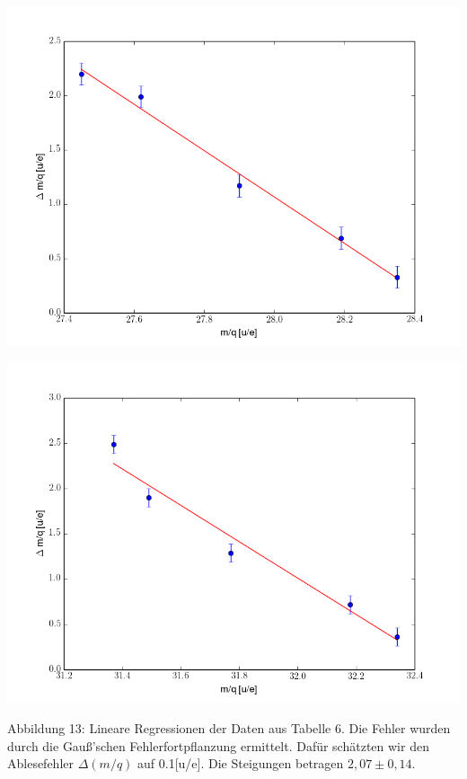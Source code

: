 \begin{center}
\begin{minipage}[t]{0.49\textwidth}
\includegraphics[width=\textwidth]{img/mq1}
\end{minipage}
\begin{minipage}[t]{0.49\textwidth}
\includegraphics[width=\textwidth]{img/mq2}
\end{minipage}
\end{center}

Abbildung 13: Lineare Regressionen der Daten aus Tabelle 6. Die Fehler wurden \hspace*{2,5cm} durch die Gauß’schen Fehlerfortpflanzung ermittelt. Dafür schätzten \hspace*{2,5cm} wir den Ablesefehler $\Delta(m/q)$ auf 0.1[u/e]. Die Steigungen betragen \hspace*{2,5cm} $2,07\pm 0,14$.

